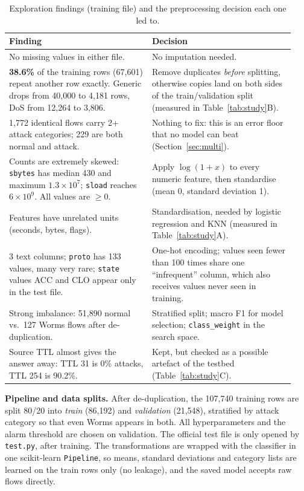 \documentclass[11pt,a4paper]{article}
\begin{document}
\begin{table}[h]
\centering\small
\begin{tabular}{p{0.47\linewidth}p{0.47\linewidth}}
\toprule
Finding & Decision \\
\midrule
No missing values in either file. & No imputation needed. \\
\textbf{38.6\%} of the training rows (67{,}601) repeat another row exactly. Generic drops from
40{,}000 to 4{,}181 rows, DoS from 12{,}264 to 3{,}806. &
Remove duplicates \emph{before} splitting, otherwise copies land on both sides of the
train/validation split (measured in Table~\ref{tab:study}B). \\
1{,}772 identical flows carry 2+ attack categories; 229 are both normal and attack. &
Nothing to fix: this is an error floor that no model can beat (Section~\ref{sec:multi}). \\
Counts are extremely skewed: \texttt{sbytes} has median 430 and maximum $1.3\times10^{7}$;
\texttt{sload} reaches $6\times10^{9}$. All values are $\ge 0$. &
Apply $\log(1+x)$ to every numeric feature, then standardise (mean 0, standard deviation 1). \\
Features have unrelated units (seconds, bytes, flags). & Standardisation, needed by logistic
regression and KNN (measured in Table~\ref{tab:study}A). \\
3 text columns; \texttt{proto} has 133 values, many very rare; \texttt{state} values ACC and CLO
appear only in the test file. &
One-hot encoding; values seen fewer than 100 times share one ``infrequent'' column, which also
receives values never seen in training. \\
Strong imbalance: 51{,}890 normal vs.\ 127 Worms flows after de-duplication. &
Stratified split; macro F1 for model selection; \texttt{class\_weight} in the search space. \\
Source TTL almost gives the answer away: TTL 31 is 0\% attacks, TTL 254 is 90.2\%. &
Kept, but checked as a possible artefact of the testbed (Table~\ref{tab:study}C). \\
\bottomrule
\end{tabular}
\caption{Exploration findings (training file) and the preprocessing decision each one led to.}
\label{tab:explore}
\end{table}

\textbf{Pipeline and data splits.} After de-duplication, the 107{,}740 training rows are split 80/20
into \emph{train} (86{,}192) and \emph{validation} (21{,}548), stratified by attack category so that
even Worms appears in both. All hyperparameters and the alarm threshold are chosen on validation.
The official test file is only opened by \texttt{test.py}, after training. The transformations are
wrapped with the classifier in one scikit-learn \texttt{Pipeline}, so means, standard deviations and
category lists are learned on the train rows only (no leakage), and the saved model accepts raw flows
directly.
\end{document}
